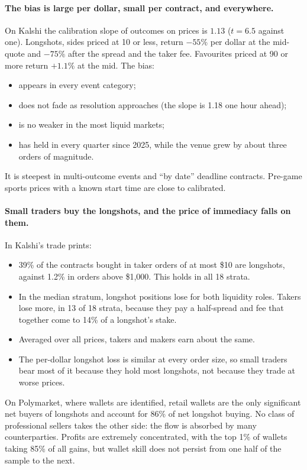 \paragraph{The bias is large per dollar, small per contract, and everywhere.} On Kalshi the
calibration slope of outcomes on prices is $1.13$ ($t=6.5$ against one). Longshots, sides priced
at 10\cents{} or less, return $-55\%$ per dollar at the mid-quote and $-75\%$ after the spread and
the taker fee. Favourites priced at 90\cents{} or more return $+1.1\%$ at the mid. The bias:
\begin{itemize}
  \item appears in every event category;
  \item does not fade as resolution approaches (the slope is 1.18 one hour ahead);
  \item is no weaker in the most liquid markets;
  \item has held in every quarter since 2025, while the venue grew by about three orders of
  magnitude.
\end{itemize}
It is steepest in multi-outcome events and ``by date'' deadline contracts. Pre-game sports prices
with a known start time are close to calibrated.

\paragraph{Small traders buy the longshots, and the price of immediacy falls on them.} In
Kalshi's trade prints:
\begin{itemize}
  \item 39\% of the contracts bought in taker orders of at most \$10 are longshots, against 1.2\%
  in orders above \$1,000. This holds in all 18 strata.
  \item In the median stratum, longshot positions lose for both liquidity roles. Takers lose
  more, in 13 of 18 strata,
  because they pay a half-spread and fee that together come to 14\% of a longshot's stake.
  \item Averaged over all prices, takers and makers earn about the same.
  \item The per-dollar longshot loss is similar at every order size, so small traders bear most
  of it because they hold most longshots, not because they trade at worse prices.
\end{itemize}
On Polymarket, where wallets are identified, retail wallets are the only significant net buyers of
longshots and account for 86\% of net longshot buying. No class of professional sellers takes the
other side: the flow is absorbed by many counterparties. Profits are extremely concentrated, with
the top 1\% of wallets taking 85\% of all gains, but wallet skill does not persist from one half of
the sample to the next.

